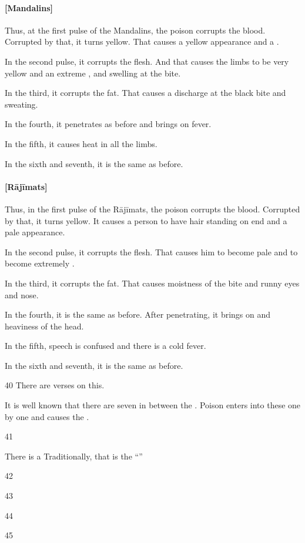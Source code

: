 \begin{translation}
    
\paragraph{[Mandalins]}    
Thus, at the first pulse of the Mandalins, the poison corrupts the blood.  
Corrupted by that, it turns yellow. That causes a yellow appearance and a 
.

In the second pulse, it corrupts the flesh.  And that causes the limbs to be very 
yellow and an extreme , and swelling at 
the bite.

In the third, it corrupts the fat.  That causes a discharge at the black bite and 
sweating.

In the fourth, it penetrates as before and brings on fever.

In the fifth, it causes heat in all the limbs. 

In the sixth and seventh, it is the same as before. 

\paragraph{[Rājīmats]}

Thus, in the first pulse of the Rājīmats, the poison corrupts the blood. 
Corrupted by that, it turns yellow.  It causes a person to have hair standing on 
end and a pale appearance. 

In the second pulse, it corrupts the flesh. That causes him to become pale and to 
become extremely .

In the third, it corrupts the fat.  That causes moistness of the bite and runny eyes 
and nose. 

In the fourth, it is the same as before.  After penetrating, it brings on 
 and heaviness of the head.

In the fifth, speech is confused and there is a cold fever.

In the sixth and seventh, it is the same as before. 



\item[40]
There are verses on this.

\begin{sloka}
    It is well known that there are seven  in between the 
.  Poison enters into these one by one and causes the 
.
\end{sloka}


\item[41]

There is a 
Traditionally, that is the “” 


\item[42]
\item[43]
\item[44]
\item[45]



    
\end{translation}